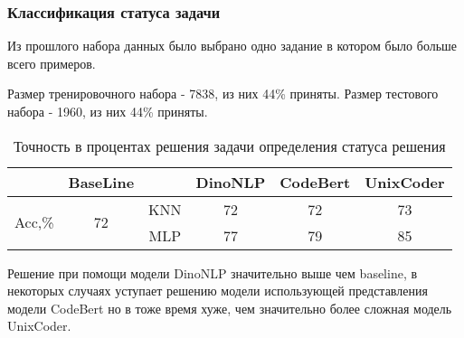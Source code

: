 \documentclass[../part_3.tex]{subfiles}
\begin{document}
\subsubsection{Классификация статуса задачи}
\par Из прошлого набора данных было выбрано одно задание в котором было больше всего примеров. %
\par Размер тренировочного набора - 7838, из них 44\% приняты. Размер тестового набора - 1960, из них 44\% приняты. 
\begin{table}[H]
    \centering
    \begin{tabular}{|c|c||c|c|c|c|}\hline 
        &BaseLine&&DinoNLP&CodeBert&UnixCoder\\ \hline 
        \multirow{2}{*}{Acc,\%}&\multirow{2}{*}{72}&KNN&72&72&73\\\cline{3-6}
        &&MLP&77&79&85\\\hline
    \end{tabular}    
    \caption{Точность в процентах решения задачи определения статуса решения}
\end{table}
\par Решение при помощи модели DinoNLP значительно выше чем baseline, в некоторых случаях уступает решению модели использующей представления модели CodeBert но в тоже время хуже, чем значительно более сложная модель UnixCoder.
\end{document}
